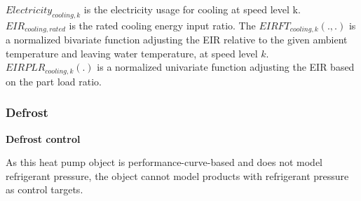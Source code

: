 $Electricity_{cooling,k}$ is the electricity usage for cooling at speed level k.
$EIR_{cooling,rated}$ is the rated cooling energy input ratio. The $EIRFT_{cooling,k}(., .)$ is a
normalized bivariate function adjusting the EIR relative to the given ambient temperature
and leaving water temperature, at speed level $k$.
$EIRPLR_{cooling,k}(.)$ is a normalized univariate function adjusting the EIR based
on the part load ratio.

\subsubsection{Defrost}

\noindent\textbf{Defrost control}

As this heat pump object is performance-curve-based and does not model
refrigerant pressure, the object cannot model products with refrigerant pressure
as control targets.

